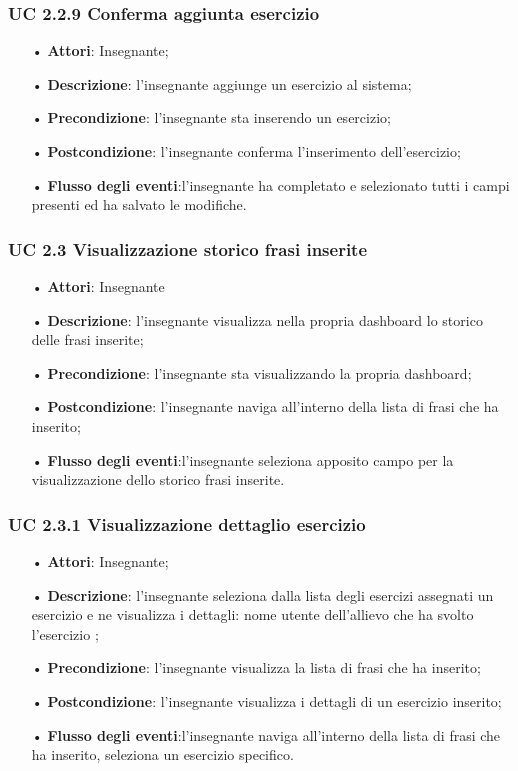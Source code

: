 \subsubsection{UC 2.2.9 Conferma aggiunta esercizio}
\begin{itemize}
	\item[•] \textbf{Attori}: Insegnante;
	\item[•] \textbf{Descrizione}: l'insegnante aggiunge un esercizio al sistema;
	\item[•] \textbf{Precondizione}: l’insegnante sta inserendo un esercizio;
	\item[•] \textbf{Postcondizione}: l'insegnante conferma l'inserimento dell'esercizio;
	\item[•] \textbf{Flusso degli eventi}:l'insegnante ha completato e selezionato tutti i campi presenti ed ha salvato le modifiche.
\end{itemize}

\subsubsection{UC 2.3 Visualizzazione storico frasi inserite}
\begin{itemize}
	\item[•] \textbf{Attori}: Insegnante	   
	\item[•] \textbf{Descrizione}: l’insegnante visualizza nella propria dashboard lo storico delle frasi inserite; 
	\item[•] \textbf{Precondizione}: l'insegnante sta visualizzando la propria dashboard;
	\item[•] \textbf{Postcondizione}: l’insegnante naviga all’interno della lista di frasi che ha inserito;
	\item[•] \textbf{Flusso degli eventi}:l'insegnante seleziona apposito campo per la visualizzazione dello storico frasi inserite.
\end{itemize}


\subsubsection{UC 2.3.1 Visualizzazione dettaglio esercizio}
\begin{itemize}
	\item[•] \textbf{Attori}: Insegnante;
	\item[•] \textbf{Descrizione}: l’insegnante seleziona dalla lista degli esercizi assegnati un esercizio e ne visualizza i dettagli: nome utente dell'allievo che ha svolto l'esercizio ;
	\item[•] \textbf{Precondizione}: l'insegnante visualizza la lista di frasi che ha inserito;
	\item[•] \textbf{Postcondizione}: l’insegnante visualizza i dettagli di un esercizio inserito;
	\item[•] \textbf{Flusso degli eventi}:l’insegnante naviga all’interno della lista di frasi che ha inserito, seleziona un esercizio specifico.
\end{itemize}


